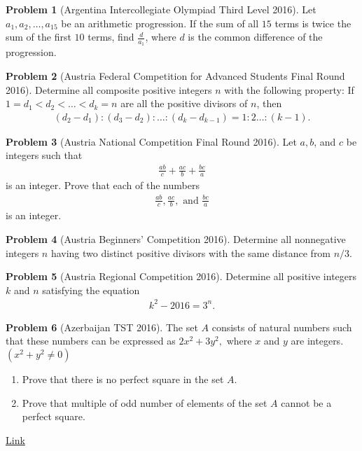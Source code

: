 \documentclass[]{article}
\theoremstyle{definition}
\newtheorem{problem}{Problem}
\begin{document}
\begin{problem}[Argentina Intercollegiate Olympiad Third Level 2016]
	Let $a_1, a_2, \dots, a_{15}$ be an arithmetic progression. If the sum of all $15$ terms is twice the sum of the first $10$ terms, find $\frac{d}{a_1}$, where $d$ is the common difference of the progression.
\end{problem}




\begin{problem}[Austria Federal Competition for Advanced Students Final Round 2016]
	Determine all composite positive integers $n$ with the following property: If $1 = d_1 < d_2 <
	\dots < d_k = n$ are all the positive divisors of $n$, then
		\begin{align*}
			(d_2-d_1):(d_3-d_2):\dots : (d_k - d_{k-1}) = 1:2\dots :(k-1).
		\end{align*}
\end{problem}



\begin{problem}[Austria National Competition Final Round 2016]
	Let $a,b$, and $c$ be integers such that
		\begin{align*}
			\frac{ab}{c} + \frac{ac}{b} + \frac{bc}{a}
		\end{align*}
	is an integer. Prove that each of the numbers
		\begin{align*}
			\frac{ab}{c} , \frac{ac}{b}, \text{ and } \frac{bc}{a}
		\end{align*}
	is an integer.
\end{problem}



\begin{problem}[Austria Beginners' Competition 2016]
	Determine all nonnegative integers $n$ having two distinct positive divisors with the same distance from $n/3$.
\end{problem}


\begin{problem}[Austria Regional Competition 2016]
	Determine all positive integers $k$ and $n$ satisfying the equation
		\begin{align*}
			k^2 - 2016 = 3^n.
		\end{align*}
\end{problem}




\begin{problem}[Azerbaijan TST 2016]
	The set $A$ consists of natural numbers such that these numbers can be expressed as $2x^2+3y^2,$ where $x$ and $y$ are integers. $(x^2+y^2\not=0)$
	\begin{enumerate}
		\item Prove that there is no perfect square in the set $A.$
		\item Prove that multiple of odd number of elements of the set $A$ cannot be a perfect square.
	\end{enumerate}
	\flushright \href{http://artofproblemsolving.com/community/c6h1201200p5906668}{Link}
\end{problem}
\end{document}
